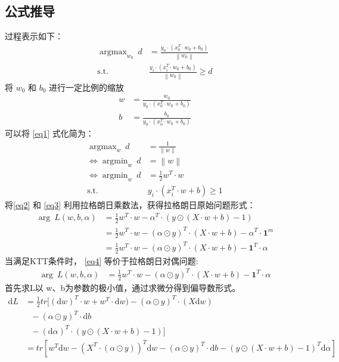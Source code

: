 \documentclass[12pt, a4paper, oneside]{ctexart}
\begin{document}
\subsection{公式推导}
过程表示如下：    
\begin{align}
    \mathop{\arg\max}_{w_0} \ d &= \frac{y_0 \cdot (x_0^T \cdot w_0 + b_0)}{ \left\|w_0\right\|} 			\label{eq1}\\
	\mathrm{ s.t. }\ \   &\frac{y_i \cdot (x_i^T \cdot w_0 + b_0)}{ \left\|w_0\right\|} \geq d				\nonumber
\end{align}
将 $w_0$ 和 $b_0$ 进行一定比例的缩放
\begin{align}
	w &= \frac{w_0 }{ y_0 \cdot (x_0^T \cdot w_0 + b_0)} 			\nonumber\\
    b &= \frac{b_0 }{ y_0 \cdot (x_0^T \cdot w_0 + b_0)} 			\nonumber
\end{align}
可以将 \eqref{eq1} 式化简为：
\begin{align}
	\mathop{\arg\max}_{w} \ d &= \frac{1}{ \left\|w\right\|} 			\nonumber\\
    \iff \mathop{\arg\min}_{w}  \ d &=  \left\|w\right\| \nonumber\\
    \iff \mathop{\arg\min}_{w}  \ d &=  \frac{1}{2}w^T \cdot w \label{eq2}\\
    \mathrm{ s.t. }\ \   & y_i \cdot (x_i^T \cdot w + b) \geq 1				\label{eq3}
\end{align}
将\eqref{eq2} 和 \eqref{eq3} 利用拉格朗日乘数法，获得拉格朗日原始问题形式：
\begin{align}
    \mathop{\arg\min_{w,b}\max_{\alpha}} \ 	L(w, b, {\alpha}) &= \frac{1}{2}	w^T \cdot w  - {\alpha} ^T \cdot  (y \odot (X \cdot w + b) - 1) \nonumber\\
        &= \frac{1}{2}	w^T \cdot w  - (\alpha \odot y) ^T \cdot  (X \cdot w + b) - \alpha^T \cdot \boldsymbol{1}^m \nonumber\\
        &= \frac{1}{2}	w^T \cdot w  - (\alpha \odot y) ^T \cdot  (X \cdot w + b) - \boldsymbol{1}^T\cdot\alpha \label{eq4}
\end{align}
当满足KTT条件时， \eqref{eq4} 等价于拉格朗日对偶问题:
\begin{align}
    \mathop{\arg\max_{\alpha}\min_{w,b}} \ 	L(w, b, {\alpha}) &= \frac{1}{2}	w^T \cdot w  - (\alpha \odot y) ^T \cdot  (X \cdot w + b) - \boldsymbol{1}^T\cdot\alpha \label{eq4_1}
\end{align}
首先求L以 w、b为参数的极小值，通过求微分得到偏导数形式。
\begin{align}
    \mathrm{d}L &= \frac{1}{2}tr[(\mathrm{d}w)^T \cdot w + w^T \cdot \mathrm{d}w) - (\alpha \odot y) ^T \cdot(X\mathrm{d}w) \nonumber \\
                & \ \ \  - (\alpha \odot y) ^T \cdot \mathrm{d}b \nonumber\\
                & \ \ \  - (\mathrm{d}\alpha)^T \cdot (y \odot (X \cdot w + b) - 1)] \nonumber \\
                &= tr[w^T\mathrm{d}w - (X^T\cdot(\alpha \odot y))^T\mathrm{d}w - (\alpha \odot y) ^T \cdot \mathrm{d}b - (y \odot (X \cdot w + b) - 1)^T\mathrm{d}\alpha] \nonumber
\end{align}
\end{document}

